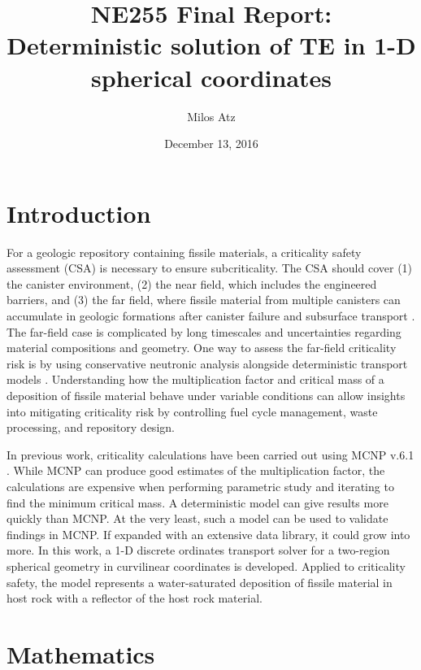 \documentclass[11pt, oneside]{article}   	%
\title{NE255 Final Report: \\
Deterministic solution of TE in 1-D spherical coordinates}
\author{Milos Atz}
\date{December 13, 2016}
\begin{document}
\maketitle

\section{Introduction}

For a geologic repository containing fissile materials, a criticality safety assessment (CSA) is necessary to ensure subcriticality. The CSA should cover (1) the canister environment, (2) the near field, which includes the engineered barriers, and (3) the far field, where fissile material from multiple canisters can accumulate in geologic formations after canister failure and subsurface transport \cite{ahn1}. The far-field case is complicated by long timescales and uncertainties regarding material compositions and geometry. One way to assess the far-field criticality risk is by using conservative neutronic analysis alongside deterministic transport models \cite{ahn1}. Understanding how the multiplication factor and critical mass of a deposition of fissile material behave under variable conditions can allow insights into mitigating criticality risk by controlling fuel cycle management, waste processing, and repository design.

In previous work, criticality calculations have been carried out using MCNP v.6.1 \cite{xudong} \cite{mcnp}. While MCNP can produce good estimates of the multiplication factor, the calculations are expensive when performing parametric study and iterating to find the minimum critical mass. A deterministic model can give results more quickly than MCNP. At the very least, such a model can be used to validate findings in MCNP. If expanded with an extensive data library, it could grow into more. In this work, a 1-D discrete ordinates transport solver for a two-region spherical geometry in curvilinear coordinates is developed. Applied to criticality safety, the model represents a water-saturated deposition of fissile material in host rock with a reflector of the host rock material.

\section{Mathematics}
\end{document}
